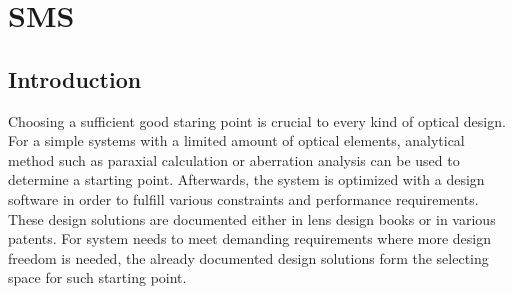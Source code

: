 \chapter{SMS} %
\label{chapter_5} %
\graphicspath{ {./chapter-5/figures/} }  %
\captionsetup[figure]{labelfont=bf}
\captionsetup{margin=1.5em}
\captionsetup[table]{labelfont=bf}






\noindent 


\section{Introduction}
Choosing a sufficient good staring point is crucial to every kind of optical design. For a simple systems with a limited amount of optical elements, analytical method such as paraxial calculation or aberration analysis can be used to determine a starting point. Afterwards, the system is optimized with a design software in order to fulfill various constraints and performance requirements. These design solutions are documented either in lens design books \cite{book:Kingslake}\cite{book:SmithModernOpticalEngineering}\cite{book:FisherOpticalSysDesign} or in various patents. For system needs to meet demanding requirements where more design freedom is needed, the already documented design solutions form the selecting space for such starting point. 

